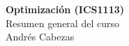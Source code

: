 \documentclass{article}
\begin{document}
\begin{center}
  \LARGE
  \textbf{Optimización (ICS1113)}
  \normalsize\\
  Resumen general del curso\\
  Andrés Cabezas
\end{center}




\end{document}
